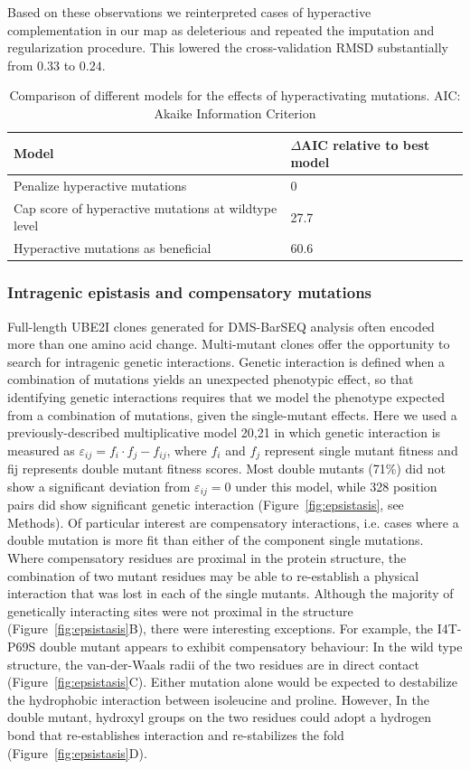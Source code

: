 Based on these observations we reinterpreted cases of hyperactive complementation in our map as deleterious and repeated the imputation and regularization procedure. This lowered the cross-validation RMSD substantially from $0.33$ to $0.24$.

\begin{table}[h!]
	\centering
	\caption{Comparison of different models for the effects of hyperactivating mutations. AIC: Akaike Information Criterion\newline}
	\begin{tabular}{l l}
Model & $\Delta$AIC relative to best model\\ \hline\hline
Penalize hyperactive mutations & 0\\
Cap score of hyperactive mutations at wildtype level & 27.7\\
Hyperactive mutations as beneficial	& 60.6	
	\end{tabular}
	\label{tab:phydms}
\end{table}



\subsubsection{Intragenic epistasis and compensatory mutations}

Full-length UBE2I clones generated for DMS-BarSEQ analysis often encoded more than one amino acid change. Multi-mutant clones offer the opportunity to search for intragenic genetic interactions. Genetic interaction is defined when a combination of mutations yields an unexpected phenotypic effect, so that identifying genetic interactions requires that we model the phenotype expected from a combination of mutations, given the single-mutant effects.  Here we used a previously-described multiplicative model 20,21 in which genetic interaction is measured as $\varepsilon_{ij} = f_i \cdot f_j - f_{ij}$, where $f_i$ and $f_j$ represent single mutant fitness and fij represents double mutant fitness scores. Most double mutants (71\%) did not show a significant deviation from $\varepsilon_{ij} = 0$ under this model, while 328 position pairs did show significant genetic interaction (Figure~\ref{fig:epsistasis}, see Methods). Of particular interest are compensatory interactions, i.e. cases where a double mutation is more fit than either of the component single mutations.  Where compensatory residues are proximal in the protein structure, the combination of two mutant residues may be able to re-establish a physical interaction that was lost in each of the single mutants. Although the majority of genetically interacting sites were not proximal in the structure (Figure~\ref{fig:epsistasis}B), there were interesting exceptions. For example, the I4T-P69S double mutant appears to exhibit compensatory behaviour: In the wild type structure, the van-der-Waals radii of the two residues are in direct contact (Figure~\ref{fig:epsistasis}C). Either mutation alone would be expected to destabilize the hydrophobic interaction between isoleucine and proline.  However, In the double mutant, hydroxyl groups on the two residues could adopt a hydrogen bond that re-establishes interaction and re-stabilizes the fold (Figure~\ref{fig:epsistasis}D).

